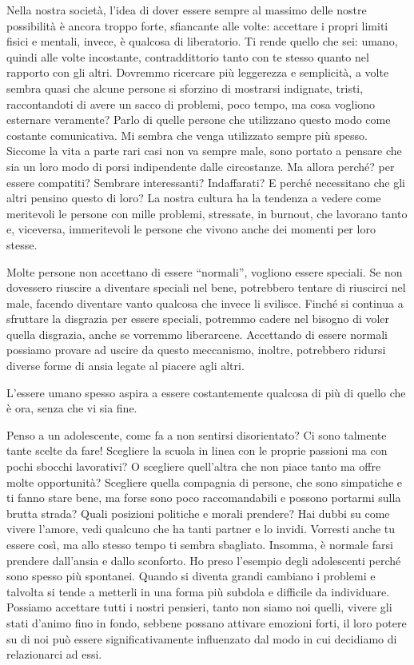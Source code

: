 \documentclass[12pt]{book} %
\begin{document}
Nella nostra società, l'idea di dover essere sempre al massimo delle nostre possibilità è ancora
troppo forte, sfiancante alle volte: accettare i propri limiti fisici e mentali, invece, è qualcosa di liberatorio. Ti
rende quello che sei: umano, quindi alle volte incostante, contraddittorio tanto con te stesso quanto nel rapporto con
gli altri. Dovremmo ricercare più
leggerezza e semplicità, a volte sembra quasi che alcune persone si sforzino di mostrarsi indignate, tristi,
raccontandoti di avere un sacco di problemi, poco tempo, ma cosa vogliono esternare veramente? Parlo di quelle persone
che utilizzano questo modo come costante comunicativa. Mi sembra che venga utilizzato sempre più spesso. Siccome la vita
a parte rari casi non va sempre male, sono portato a pensare che sia un loro modo di porsi indipendente dalle
circostanze. Ma allora perché? per essere compatiti? Sembrare interessanti? Indaffarati? E perché necessitano che gli
altri pensino questo di loro? La nostra cultura ha la tendenza a vedere come meritevoli le persone con mille problemi,
stressate, in burnout, che lavorano tanto e, viceversa, immeritevoli le persone che vivono anche dei momenti per loro
stesse.

Molte persone non accettano di essere “normali”, vogliono essere speciali. Se non dovessero riuscire a diventare speciali
nel bene, potrebbero tentare di riuscirci nel male, facendo diventare vanto qualcosa che invece li svilisce. Finché si
continua a sfruttare la disgrazia per essere speciali, potremmo cadere nel bisogno di voler quella disgrazia, anche se vorremmo
liberarcene. Accettando di essere normali possiamo provare ad uscire da questo meccanismo, inoltre, potrebbero ridursi
diverse forme di ansia legate al piacere agli altri. 

L'essere umano spesso aspira a essere costantemente qualcosa di più di quello che è ora, senza che vi sia fine.

Penso a un adolescente, come fa a non sentirsi disorientato? Ci sono talmente tante scelte da fare! Scegliere la scuola
in linea con le proprie passioni ma con pochi sbocchi lavorativi? O scegliere quell'altra che non
piace tanto ma offre molte opportunità? Scegliere quella compagnia di persone, che sono simpatiche e ti fanno stare
bene, ma forse sono poco raccomandabili e possono portarmi sulla brutta strada? Quali posizioni politiche e morali prendere?  Hai dubbi su come vivere l'amore, vedi qualcuno che ha tanti partner e lo invidi.
Vorresti anche tu essere così, ma allo stesso tempo ti sembra sbagliato. Insomma, è normale farsi prendere
dall'ansia e dallo sconforto. Ho preso l'esempio degli adolescenti perché sono spesso più spontanei. Quando si
diventa grandi cambiano i problemi e talvolta si tende a metterli in una forma più subdola e difficile da individuare. Possiamo accettare
tutti i nostri pensieri, tanto non siamo noi quelli, vivere gli stati d'animo fino in fondo, sebbene possano attivare emozioni forti, il loro potere su di noi può essere significativamente influenzato dal modo in cui decidiamo di relazionarci ad essi.
\end{document}
